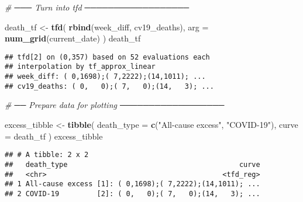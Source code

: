 \documentclass[
]{article}
\newenvironment{Shaded}{\begin{snugshade}}{\end{snugshade}}
\newcommand{\AttributeTok}[1]{\textcolor[rgb]{0.13,0.29,0.53}{#1}}
\newcommand{\CommentTok}[1]{\textcolor[rgb]{0.56,0.35,0.01}{\textit{#1}}}
\newcommand{\FunctionTok}[1]{\textcolor[rgb]{0.13,0.29,0.53}{\textbf{#1}}}
\newcommand{\NormalTok}[1]{#1}
\newcommand{\OtherTok}[1]{\textcolor[rgb]{0.56,0.35,0.01}{#1}}
\newcommand{\StringTok}[1]{\textcolor[rgb]{0.31,0.60,0.02}{#1}}
\begin{document}
\begin{Shaded}
\begin{Highlighting}[]
\CommentTok{\# ─── Turn into tfd ──────────────────}

\NormalTok{death\_tf }\OtherTok{\textless{}{-}} \FunctionTok{tfd}\NormalTok{(}
  \FunctionTok{rbind}\NormalTok{(week\_diff, cv19\_deaths),}
  \AttributeTok{arg =} \FunctionTok{num\_grid}\NormalTok{(current\_date)}
\NormalTok{)}
\NormalTok{death\_tf}
\end{Highlighting}
\end{Shaded}

\begin{verbatim}
## tfd[2] on (0,357) based on 52 evaluations each
## interpolation by tf_approx_linear 
## week_diff: ( 0,1698);( 7,2222);(14,1011); ...
## cv19_deaths: ( 0,   0);( 7,   0);(14,   3); ...
\end{verbatim}

\begin{Shaded}
\begin{Highlighting}[]
\CommentTok{\# ── Prepare data for plotting ──────────────────}

\NormalTok{excess\_tibble }\OtherTok{\textless{}{-}} \FunctionTok{tibble}\NormalTok{(}
  \AttributeTok{death\_type =} \FunctionTok{c}\NormalTok{(}\StringTok{"All{-}cause excess"}\NormalTok{, }\StringTok{"COVID{-}19"}\NormalTok{),}
  \AttributeTok{curve      =}\NormalTok{ death\_tf}
\NormalTok{)}
\NormalTok{excess\_tibble}
\end{Highlighting}
\end{Shaded}

\begin{verbatim}
## # A tibble: 2 x 2
##   death_type                                         curve
##   <chr>                                          <tfd_reg>
## 1 All-cause excess [1]: ( 0,1698);( 7,2222);(14,1011); ...
## 2 COVID-19         [2]: ( 0,   0);( 7,   0);(14,   3); ...
\end{verbatim}
\end{document}
